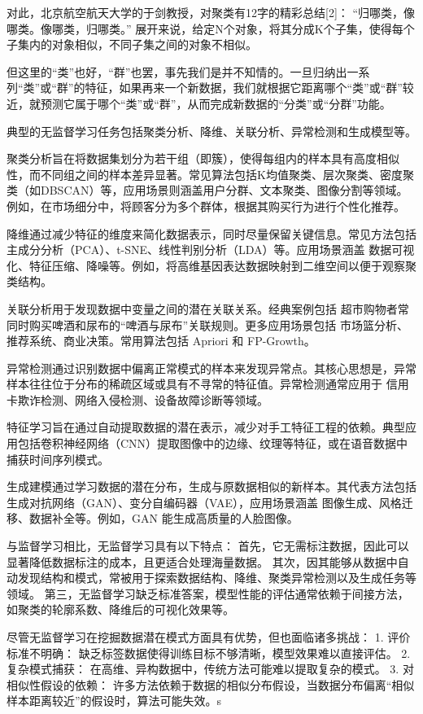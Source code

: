 {对此，北京航空航天大学的于剑教授，对聚类有12字的精彩总结[2]：
“归哪类，像哪类。像哪类，归哪类。”
展开来说，给定N个对象，将其分成K个子集，使得每个子集内的对象相似，不同子集之间的对象不相似。

但这里的“类”也好，“群”也罢，事先我们是并不知情的。一旦归纳出一系列“类”或“群”的特征，如果再来一个新数据，我们就根据它距离哪个“类”或“群”较近，就预测它属于哪个“类”或“群”，从而完成新数据的“分类”或“分群”功能。

典型的无监督学习任务包括聚类分析、降维、关联分析、异常检测和生成模型等。

聚类分析旨在将数据集划分为若干组（即簇），使得每组内的样本具有高度相似性，而不同组之间的样本差异显著。常见算法包括K均值聚类、层次聚类、密度聚类（如DBSCAN）等，应用场景则涵盖用户分群、文本聚类、图像分割等领域。例如，在市场细分中，将顾客分为多个群体，根据其购买行为进行个性化推荐。

降维通过减少特征的维度来简化数据表示，同时尽量保留关键信息。常见方法包括主成分分析（PCA）、t-SNE、线性判别分析（LDA）等。应用场景涵盖 数据可视化、特征压缩、降噪等。例如，将高维基因表达数据映射到二维空间以便于观察聚类结构。

关联分析用于发现数据中变量之间的潜在关联关系。经典案例包括 超市购物者常同时购买啤酒和尿布的“啤酒与尿布”关联规则。更多应用场景包括 市场篮分析、推荐系统、商业决策。常用算法包括 Apriori 和 FP-Growth。

异常检测通过识别数据中偏离正常模式的样本来发现异常点。其核心思想是，异常样本往往位于分布的稀疏区域或具有不寻常的特征值。异常检测通常应用于 信用卡欺诈检测、网络入侵检测、设备故障诊断等领域。

特征学习旨在通过自动提取数据的潜在表示，减少对手工特征工程的依赖。典型应用包括卷积神经网络（CNN）提取图像中的边缘、纹理等特征，或在语音数据中捕获时间序列模式。

生成建模通过学习数据的潜在分布，生成与原数据相似的新样本。其代表方法包括生成对抗网络（GAN）、变分自编码器（VAE），应用场景涵盖 图像生成、风格迁移、数据补全等。例如，GAN 能生成高质量的人脸图像。

与监督学习相比，无监督学习具有以下特点：
首先，它无需标注数据，因此可以显著降低数据标注的成本，且更适合处理海量数据。
其次，因其能够从数据中自动发现结构和模式，常被用于探索数据结构、降维、聚类异常检测以及生成任务等领域。
第三，无监督学习缺乏标准答案，模型性能的评估通常依赖于间接方法，如聚类的轮廓系数、降维后的可视化效果等。

尽管无监督学习在挖掘数据潜在模式方面具有优势，但也面临诸多挑战：
1. 评价标准不明确： 缺乏标签数据使得训练目标不够清晰，模型效果难以直接评估。
2. 复杂模式捕获： 在高维、异构数据中，传统方法可能难以提取复杂的模式。
3. 对相似性假设的依赖： 许多方法依赖于数据的相似分布假设，当数据分布偏离“相似样本距离较近”的假设时，算法可能失效。s

}

